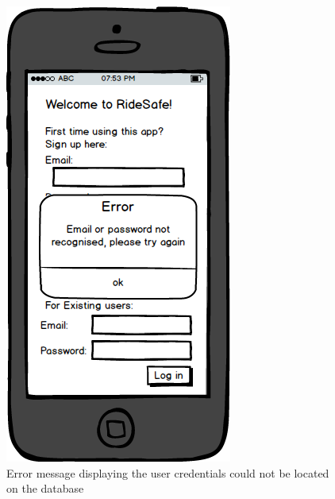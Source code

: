 \documentclass[a4paper]{report}
\begin{document}
\clearpage
\begin{figure}
\centering
\includegraphics[scale=0.9]{figures/prototype_2/unrecognised_err}
\caption{Error message displaying the user credentials could not be located on the database}
\end{figure}
\clearpage
\end{document}
